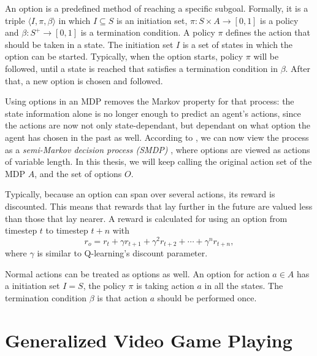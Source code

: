 An option is a predefined method of reaching a specific subgoal. Formally, it is
a triple $\langle I, \pi, \beta\rangle$ in which $I \subseteq S$ is an
initiation set, $\pi: S \times A \rightarrow [0, 1]$ is a policy and $\beta: S^+
\rightarrow[0,1]$ is a termination condition.  A policy $\pi$ defines the action
that should be taken in a state. The initiation set $I$ is a set of states in
which the option can be started. Typically, when the option starts, policy $\pi$
will be followed, until a state is reached that satisfies a termination
condition in $\beta$. After that, a new option is chosen and followed. 

Using options in an MDP removes the Markov property for that process: the state
information alone is no longer enough to predict an agent's actions, since the
actions are now not only state-dependant, but dependant on what option the agent
has chosen in the past as well. According to \cite{sutton1999between}, we can
now view the process as a \emph{semi-Markov decision process (SMDP)}
\cite{duff1995reinforcement}, where options are viewed as actions of variable
length. In this thesis, we will keep calling the original action set of the MDP
$A$, and the set of options $O$.  

Typically, because an option can span over several actions, its reward is
discounted. This means that rewards that lay further in the future are valued
less than those that lay nearer. A reward is calculated for using an option from
timestep $t$ to timestep $t+n$ with
\begin{equation}
	\label{eq:option-reward}
	r_o = r_{t} + \gamma r_{t+1} + \gamma^2 r_{t+2} + \cdots + \gamma^n r_{t+n},
\end{equation}
where $\gamma$ is similar to Q-learning's discount parameter.

Normal actions can be treated as options as
well.  An option for action $a \in A$ has a initiation set $I = S$, the policy
$\pi$ is taking action $a$ in all the states.  The termination condition $\beta$
is that action $a$ should be performed once. 



\section{Generalized Video Game Playing}
\label{subsec:vgdl}

